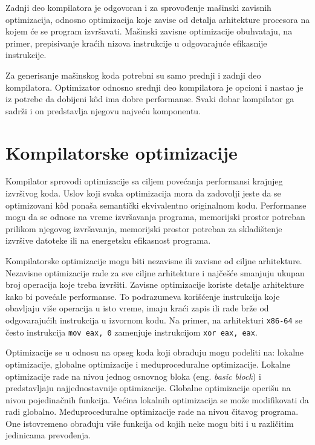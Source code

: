 \documentclass[12pt,oneside]{memoir}
\begin{document}
Zadnji deo kompilatora je odgovoran i za sprovođenje mašinski zavisnih optimizacija, odnosno optimizacija koje zavise od detalja arhitekture procesora na kojem će se program izvršavati. Mašinski zavisne optimizacije obuhvataju, na primer, prepisivanje kraćih nizova instrukcije u odgovarajuće efikasnije instrukcije.



Za generisanje mašinskog koda potrebni su samo prednji i zadnji deo kompilatora. Optimizator odnosno srednji deo kompilatora je opcioni i nastao je iz potrebe da dobijeni kôd ima dobre performanse. Svaki dobar kompilator ga sadrži i on predstavlja njegovu najveću komponentu.

\section{Kompilatorske optimizacije}
\label{sec:compiler_optimization}
Kompilator sprovodi optimizacije sa ciljem povećanja performansi krajnjeg izvršivog koda. Uslov koji svaka optimizacija mora da zadovolji jeste da se optimizovani k\^od ponaša semantički ekvivalentno originalnom kodu. Performanse mogu da se odnose na vreme izvršavanja programa, memorijski prostor potreban prilikom njegovog izvršavanja, memorijski prostor potreban za skladištenje izvršive datoteke ili na energetsku efikasnost programa. 

Kompilatorske optimizacije mogu biti nezavisne ili zavisne od ciljne arhitekture. Nezavisne optimizacije rade za sve ciljne arhitekture i najčešće smanjuju ukupan broj operacija koje treba izvršiti. Zavisne optimizacije koriste detalje arhitekture kako bi povećale performanse. To podrazumeva korišćenje instrukcija koje obavljaju više operacija u isto vreme, imaju kraći zapis ili rade brže od odgovarajućih instrukcija u izvornom kodu. Na primer, na arhitekturi
\texttt{x86-64} se često instrukcija \texttt{mov eax, 0} zamenjuje instrukcijom \texttt{xor eax, eax}.

Optimizacije se u odnosu na opseg koda koji obrađuju mogu podeliti na: lokalne 
optimizacije, globalne optimizacije i međuproceduralne optimizacije.
Lokalne optimizacije rade na nivou jednog osnovnog bloka (eng. \textit{basic block}) i predstavljaju najjednostavnije optimizacije. Globalne optimizacije operišu na nivou pojedinačnih funkcija. Većina lokalnih optimizacija se može modifikovati da radi globalno. Međuproceduralne optimizacije rade na nivou čitavog programa. One istovremeno obrađuju više funkcija od kojih neke mogu biti i u različitim jedinicama prevođenja.
\end{document}
